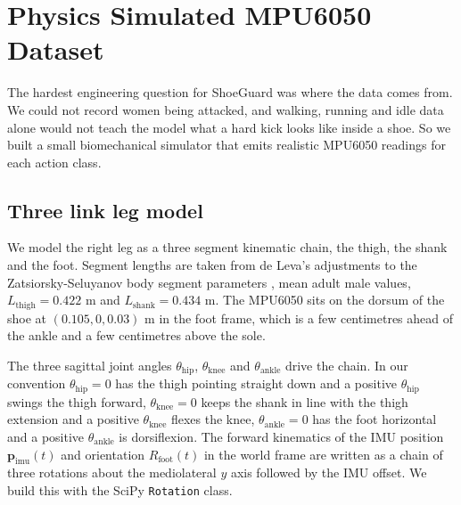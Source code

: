 \documentclass[conference]{IEEEtran}
\begin{document}
\section{Physics Simulated MPU6050 Dataset}

The hardest engineering question for ShoeGuard was where the data comes from. We could not record women being attacked, and walking, running and idle data alone would not teach the model what a hard kick looks like inside a shoe. So we built a small biomechanical simulator that emits realistic MPU6050 readings for each action class.

\subsection{Three link leg model}
We model the right leg as a three segment kinematic chain, the thigh, the shank and the foot. Segment lengths are taken from de Leva's adjustments to the Zatsiorsky-Seluyanov body segment parameters \cite{deleva1996}, mean adult male values, $L_\text{thigh} = 0.422$ m and $L_\text{shank} = 0.434$ m. The MPU6050 sits on the dorsum of the shoe at $(0.105, 0, 0.03)$ m in the foot frame, which is a few centimetres ahead of the ankle and a few centimetres above the sole.

The three sagittal joint angles $\theta_\text{hip}$, $\theta_\text{knee}$ and $\theta_\text{ankle}$ drive the chain. In our convention $\theta_\text{hip}=0$ has the thigh pointing straight down and a positive $\theta_\text{hip}$ swings the thigh forward, $\theta_\text{knee}=0$ keeps the shank in line with the thigh extension and a positive $\theta_\text{knee}$ flexes the knee, $\theta_\text{ankle}=0$ has the foot horizontal and a positive $\theta_\text{ankle}$ is dorsiflexion. The forward kinematics of the IMU position $\mathbf{p}_\text{imu}(t)$ and orientation $R_\text{foot}(t)$ in the world frame are written as a chain of three rotations about the mediolateral $y$ axis followed by the IMU offset. We build this with the SciPy \texttt{Rotation} class.
\end{document}
